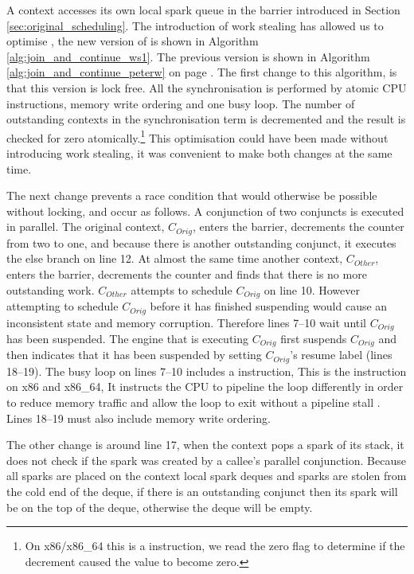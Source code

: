A context accesses its own local spark queue in the \joinandcontinue barrier
introduced in Section \ref{sec:original_scheduling}.
The introduction of work stealing has allowed us to optimise
\joinandcontinue,
the new version of \joinandcontinue is shown in Algorithm
\ref{alg:join_and_continue_ws1}.
The previous version is shown in
Algorithm \ref{alg:join_and_continue_peterw}
on page \pageref{alg:join_and_continue_peterw}.
The first change to this algorithm,
is that this version is lock free.
All the synchronisation is performed by atomic CPU instructions, memory
write ordering and one busy loop.
The number of outstanding contexts in the synchronisation term is
decremented and the result is checked for zero atomically.\footnote{
    On x86/x86\_64 this is a  instruction, we read the
    zero flag to determine if the decrement caused the value to become
    zero.}
This optimisation could have been made without introducing work stealing,
it was convenient to make both changes at the same time.

The next change prevents a race condition that would otherwise be possible
without locking, and occur as follows.
A conjunction of two conjuncts is executed in parallel.
The original context, $C_{Orig}$,
enters the barrier, decrements the counter from two to one,
and because there is another outstanding conjunct,
it executes the else branch on line 12.
At almost the same time another context, $C_{Other}$,
enters the barrier, decrements the counter and finds that there is no more
outstanding work.
$C_{Other}$ attempts to schedule $C_{Orig}$ on line 10.
However attempting to schedule $C_{Orig}$ before it has finished suspending
would cause an inconsistent state and memory corruption.
Therefore lines 7--10 wait until $C_{Orig}$ has been suspended.
The engine that is executing $C_{Orig}$ first suspends $C_{Orig}$ and then
indicates that it has been suspended by setting $C_{Orig}$'s resume label
(lines 18--19).
The busy loop on lines 7--10 includes a  instruction,
This is the  instruction on x86 and x86\_64,
It instructs the CPU to pipeline the loop differently in order to reduce
memory traffic and allow the loop to exit without a pipeline stall
\citep{intel:pause}.
Lines 18--19 must also include memory write ordering.

The other change is around line 17,
when the context pops a spark of its stack, it does not check if the spark
was created by a callee's parallel conjunction.
Because all sparks are placed on the context local spark deques and
sparks are stolen from the cold end of the deque,
if there is an outstanding conjunct then its spark will be on the top of the
deque,
otherwise the deque will be empty.

